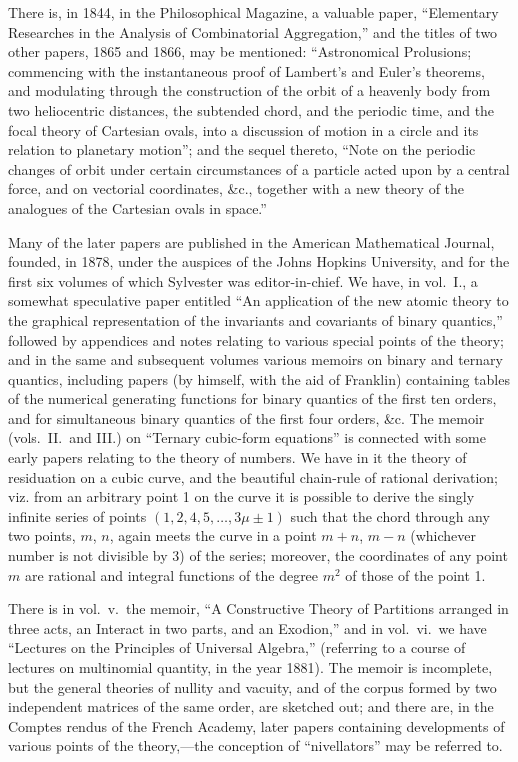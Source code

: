 \documentclass[11pt,a4paper]{book}
\begin{document}
There is, in 1844, in the Philosophical Magazine, a valuable paper, ``Elementary Researches in the Analysis of Combinatorial Aggregation,'' and the titles of two other papers, 1865 and 1866, may be mentioned: ``Astronomical Prolusions; commencing with the instantaneous proof of Lambert's and Euler's theorems, and modulating through the construction of the orbit of a heavenly body from two heliocentric distances, the subtended chord, and the periodic time, and the focal theory of Cartesian ovals, into a discussion of motion in a circle and its relation to planetary motion''; and the sequel thereto, ``Note on the periodic changes of orbit under certain circumstances of a particle acted upon by a central force, and on vectorial coordinates, \&c., together with a new theory of the analogues of the Cartesian ovals in space.''

Many of the later papers are published in the American Mathematical Journal, founded, in 1878, under the auspices of the Johns Hopkins University, and for the first six volumes of which Sylvester was editor-in-chief. We have, in vol.\ I., a somewhat speculative paper entitled ``An application of the new atomic theory to the graphical representation of the invariants and covariants of binary quantics,'' followed by appendices and notes relating to various special points of the theory; and in the same and subsequent volumes various memoirs on binary and ternary quantics, including papers (by himself, with the aid of Franklin) containing tables of the numerical generating functions for binary quantics of the first ten orders, and for simultaneous binary quantics of the first four orders, \&c. The memoir (vols.\ II.\ and III.) on ``Ternary cubic-form equations'' is connected with some early papers relating to the theory of numbers. We have in it the theory of residuation on a cubic curve, and the beautiful chain-rule of rational derivation; viz. from an arbitrary point 1 on the curve it is possible to derive the singly infinite series of points $(1, 2, 4, 5, \ldots, 3\mu \pm 1)$ such that the chord through any two points, $m$, $n$, again meets the curve in a point $m + n$, $m - n$ (whichever number is not divisible by 3) of the series; moreover, the coordinates of any point $m$ are rational and integral functions of the degree $m^2$ of those of the point 1.

There is in vol.\ v.\ the memoir, ``A Constructive Theory of Partitions arranged in three acts, an Interact in two parts, and an Exodion,'' and in vol.\ vi.\ we have ``Lectures on the Principles of Universal Algebra,'' (referring to a course of lectures on multinomial quantity, in the year 1881). The memoir is incomplete, but the general theories of nullity and vacuity, and of the corpus formed by two independent matrices of the same order, are sketched out; and there are, in the Comptes rendus of the French Academy, later papers containing developments of various points of the theory,---the conception of ``nivellators'' may be referred to.
\end{document}
